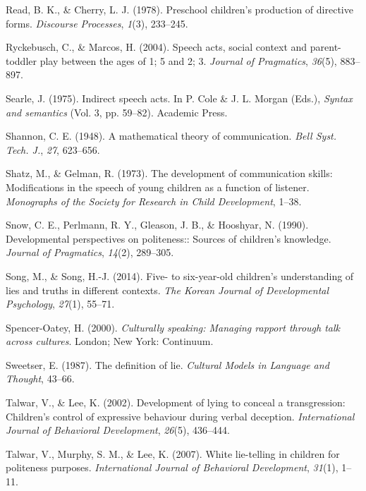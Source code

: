 \documentclass[oneside]{report}
\begin{document}
\hypertarget{ref-read1978}{}
Read, B. K., \& Cherry, L. J. (1978). Preschool children's production of
directive forms. \emph{Discourse Processes}, \emph{1}(3), 233--245.

\hypertarget{ref-ryckebusch2004}{}
Ryckebusch, C., \& Marcos, H. (2004). Speech acts, social context and
parent-toddler play between the ages of 1; 5 and 2; 3. \emph{Journal of
Pragmatics}, \emph{36}(5), 883--897.

\hypertarget{ref-searle1975}{}
Searle, J. (1975). Indirect speech acts. In P. Cole \& J. L. Morgan
(Eds.), \emph{Syntax and semantics} (Vol. 3, pp. 59--82). Academic
Press.

\hypertarget{ref-shannon1948}{}
Shannon, C. E. (1948). A mathematical theory of communication.
\emph{Bell Syst. Tech. J.}, \emph{27}, 623--656.

\hypertarget{ref-shatz1973}{}
Shatz, M., \& Gelman, R. (1973). The development of communication
skills: Modifications in the speech of young children as a function of
listener. \emph{Monographs of the Society for Research in Child
Development}, 1--38.

\hypertarget{ref-snow1990}{}
Snow, C. E., Perlmann, R. Y., Gleason, J. B., \& Hooshyar, N. (1990).
Developmental perspectives on politeness:: Sources of children's
knowledge. \emph{Journal of Pragmatics}, \emph{14}(2), 289--305.

\hypertarget{ref-song2014}{}
Song, M., \& Song, H.-J. (2014). Five- to six-year-old children's
understanding of lies and truths in different contexts. \emph{The Korean
Journal of Developmental Psychology}, \emph{27}(1), 55--71.

\hypertarget{ref-spencer2000}{}
Spencer-Oatey, H. (2000). \emph{Culturally speaking: Managing rapport
through talk across cultures}. London; New York: Continuum.

\hypertarget{ref-sweetser1987}{}
Sweetser, E. (1987). The definition of lie. \emph{Cultural Models in
Language and Thought}, 43--66.

\hypertarget{ref-talwar2002}{}
Talwar, V., \& Lee, K. (2002). Development of lying to conceal a
transgression: Children's control of expressive behaviour during verbal
deception. \emph{International Journal of Behavioral Development},
\emph{26}(5), 436--444.

\hypertarget{ref-talwar2007}{}
Talwar, V., Murphy, S. M., \& Lee, K. (2007). White lie-telling in
children for politeness purposes. \emph{International Journal of
Behavioral Development}, \emph{31}(1), 1--11.
\end{document}
